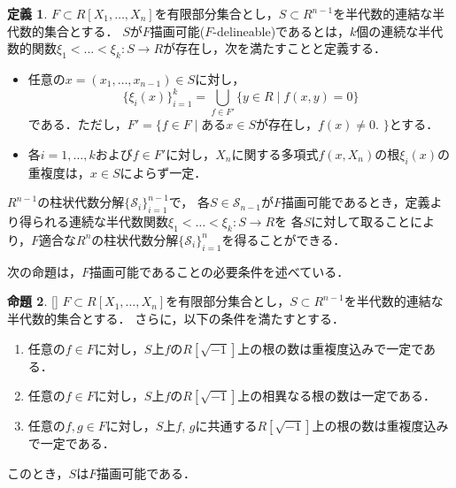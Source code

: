 \documentclass[uplatex, dvipdfmx]{jsarticle}
\numberwithin{equation}{section}
\newcommand{\map}[3]{{#1}\colon{#2}\rightarrow{#3}}
\theoremstyle{definition}
\newtheorem{definition}{定義}[section]
\newtheorem{proposition}[definition]{命題}
\begin{document}
\begin{definition} 
     $F \subset R[X_1, \dots, X_n]$を有限部分集合とし，$S \subset R^{n-1}$を半代数的連結な半代数的集合とする．
     $S$が$F$描画可能($F$-delineable)であるとは，$k$個の連続な半代数的関数$\map{\xi_1<\dots<\xi_k}{S}{R}$が存在し，次を満たすことと定義する．
     \begin{itemize}
          \item 任意の$ x = (x_1, \dots, x_{n-1}) \in S $に対し，
          \begin{equation}
               \{\xi_i(x)\}_{i=1}^k = \bigcup_{f \in F'}\{y \in R \mid f(x,y)=0\}
          \end{equation}
          である．ただし，$F' = \{f \in F \mid \text{ある$x \in S$が存在し，$f(x) \neq 0$. }\}$とする．
          \item 各$i=1, \dots, k$および$f \in F'$に対し，$X_n$に関する多項式$f(x,X_n)$の根$\xi_i(x)$の重複度は，$x\in S$によらず一定．
     \end{itemize}
\end{definition}

$R^{n-1}$の柱状代数分解$\{\mathcal{S}_i\}_{i=1}^{n-1}$で，
各$S \in \mathcal{S}_{n-1}$が$F$描画可能であるとき，定義より得られる連続な半代数関数$\map{\xi_1<\dots<\xi_k}{S}{R}$を
各$S$に対して取ることにより，$F$適合な$R^n$の柱状代数分解$\{\mathcal{S}_i\}_{i=1}^n$を得ることができる．

次の命題は，$F$描画可能であることの必要条件を述べている．


\begin{proposition}\label{proposition:del}[{\cite[Proposition 5.14.]{MR2248869}}]
     $F \subset R[X_1, \dots, X_n]$を有限部分集合とし，$S \subset R^{n-1}$を半代数的連結な半代数的集合とする．
     さらに，以下の条件を満たすとする．
     \begin{enumerate}
          \item \label{proposition:del-1}
          任意の$f \in F$に対し，$S$上$f$の$R[\sqrt{-1}]$上の根の数は重複度込みで一定である．
          \item \label{proposition:del-2}
          任意の$f \in F$に対し，$S$上$f$の$R[\sqrt{-1}]$上の相異なる根の数は一定である．
          \item \label{proposition:del-3}
          任意の$f, g \in F$に対し，$S$上$f$, $g$に共通する$R[\sqrt{-1}]$上の根の数は重複度込みで一定である．
     \end{enumerate}
     このとき，$S$は$F$描画可能である．
\end{proposition}
\end{document}
